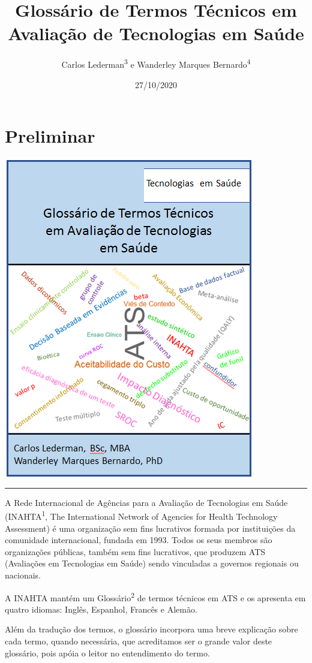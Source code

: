 \documentclass[
]{book}
\title{Glossário de Termos Técnicos em Avaliação de Tecnologias em Saúde}
\author{Carlos Lederman\textsuperscript{3} e Wanderley Marques Bernardo\textsuperscript{4}}
\date{27/10/2020}
\begin{document}
\maketitle

{
\setcounter{tocdepth}{1}
\tableofcontents
}
\hypertarget{preliminar}{%
\chapter*{Preliminar}\label{preliminar}}

\begin{center}\includegraphics[width=height=4in,width=3in]{capa11} \end{center}

\begin{center}\rule{0.5\linewidth}{0.5pt}\end{center}

A Rede Internacional de Agências para a Avaliação de Tecnologias em Saúde (INAHTA\textsuperscript{1}, The International Network of Agencies for Health Technology Assessment) é uma organização sem fins lucrativos formada por instituições
da comunidade internacional, fundada em 1993. Todos os seus membros são organizações públicas, também sem fins lucrativos, que produzem ATS (Avaliações em Tecnologias em Saúde) sendo vinculadas a governos regionais ou nacionais.

A INAHTA mantém um Glossário\textsuperscript{2} de termos técnicos em ATS e os apresenta em quatro idiomas: Inglês, Espanhol, Francês e Alemão.

Além da tradução dos termos, o glossário incorpora uma breve explicação sobre cada termo, quando necessária, que acreditamos ser o grande valor deste glossário, pois apóia o leitor no entendimento do termo.
\end{document}
